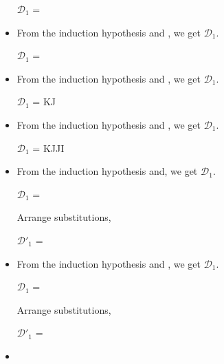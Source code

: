 \begin{itemize}
	$\mathcal{D}_1$ = 
	{}

	\item \QKRefl

	From the induction hypothesis and \QKRefl, we get $\mathcal{D}_1$.

	$\mathcal{D}_1$ = 
	{}

	\item \QKSym

	From the induction hypothesis and \QKSym, we get $\mathcal{D}_1$.

	$\mathcal{D}_1$ = 
	{\GGV K\SB\E J\SB@A}

	\item \QKTrans

	From the induction hypothesis and \QKTrans, we get $\mathcal{D}_1$.

	$\mathcal{D}_1$ = 
	{\GGV K\SB\E J\SB@A \andalso \GGV J\SB\E I\SB@A}

	\item \QTAbs

	From the induction hypothesis and, we get $\mathcal{D}_1$.

	$\mathcal{D}_1$ = 
	{\ID{\GG \tau\SB \E \sigma\SB@A} \andalso {}}

	Arrange substitutions,

	$\mathcal{D}'_1$ = 
	{\ID{\GG \tau\SB \E \sigma\SB@A} \andalso {}}

	\item \QTApp

	From the induction hypothesis and \QTApp, we get $\mathcal{D}_1$.

	$\mathcal{D}_1$ = 
	{ \andalso {}}

	Arrange substitutions,

	$\mathcal{D}'_1$ = 
	{ \andalso {}}

	\item \QTTW


\end{itemize}
